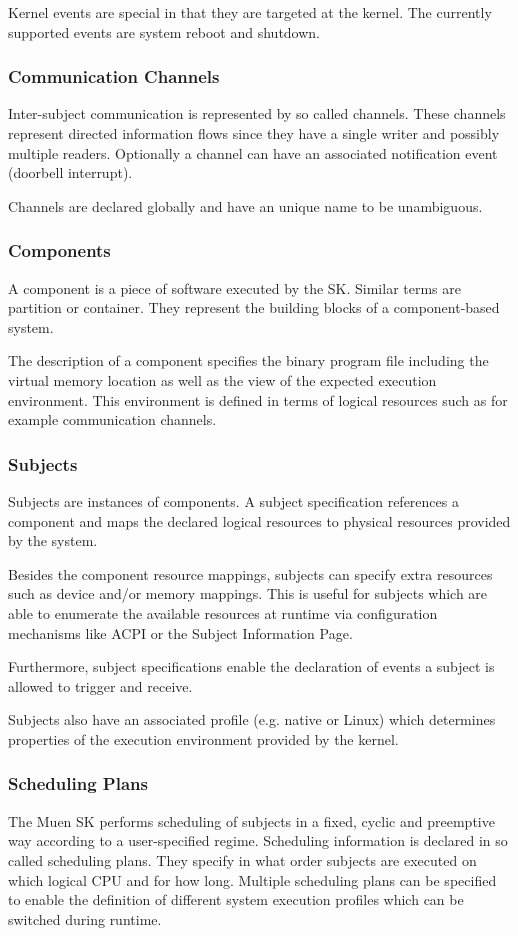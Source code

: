 \documentclass[a4paper,twoside,titlepage]{article}
\begin{document}
Kernel events are special in that they are targeted at the kernel. The
currently supported events are system reboot and shutdown.

\subsubsection{Communication Channels}
Inter-subject communication is represented by so called channels. These channels
represent directed information flows since they have a single writer and
possibly multiple readers. Optionally a channel can have an associated
notification event (doorbell interrupt).

Channels are declared globally and have an unique name to be unambiguous.

\subsubsection{Components}
A component is a piece of software executed by the SK. Similar terms are
partition or container. They represent the building blocks of a component-based
system.

The description of a component specifies the binary program file including the
virtual memory location as well as the view of the expected execution
environment. This environment is defined in terms of logical resources such as
for example communication channels.

\subsubsection{Subjects}
Subjects are instances of components. A subject specification references a
component and maps the declared logical resources to physical resources provided
by the system.

Besides the component resource mappings, subjects can specify extra resources
such as device and/or memory mappings. This is useful for subjects which are
able to enumerate the available resources at runtime via configuration
mechanisms like ACPI or the Subject Information Page.

Furthermore, subject specifications enable the declaration of events a subject
is allowed to trigger and receive.

Subjects also have an associated profile (e.g. native or Linux) which determines
properties of the execution environment provided by the kernel.

\subsubsection{Scheduling Plans}
The Muen SK performs scheduling of subjects in a fixed, cyclic and
preemptive way according to a user-specified regime. Scheduling information is
declared in so called scheduling plans. They specify in what order subjects are
executed on which logical CPU and for how long. Multiple scheduling plans can be
specified to enable the definition of different system execution profiles which
can be switched during runtime.
\end{document}
